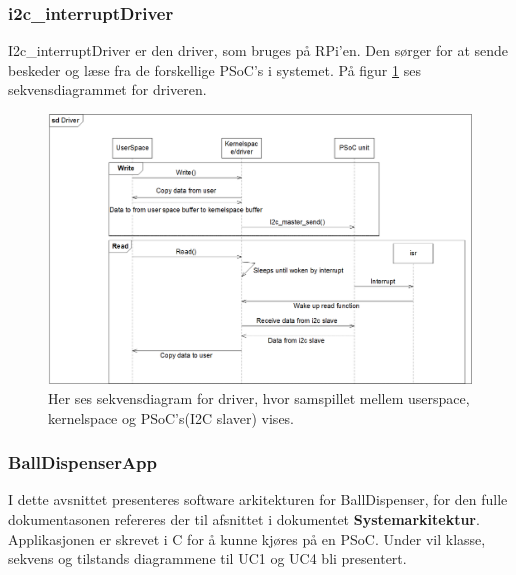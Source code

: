 \documentclass[Rapport/Rapport_main.tex]{subfiles}
\begin{document}
\subsubsection{i2c\_interruptDriver}\label{sec:rap_i2c_intdriver}
I2c\_interruptDriver er den driver, som bruges på RPi'en. Den sørger for at sende beskeder og læse fra de forskellige PSoC's i systemet. På figur \ref{fig:driver_sekvensdiagram} ses sekvensdiagrammet for driveren. 
\begin{figure}[H]
    \centering
    \includegraphics[width=\textwidth]{Rapport/Arkitektur/graphics/driver_sekvensdiagram.png}
    \caption{Her ses sekvensdiagram for driver, hvor samspillet mellem userspace, kernelspace og PSoC's(I2C slaver) vises.}
    \label{fig:driver_sekvensdiagram}
\end{figure}

\subsubsection{BallDispenserApp}
I dette avsnittet presenteres software arkitekturen for BallDispenser, for den fulle dokumentasonen refereres der til afsnittet  i dokumentet \textbf{Systemarkitektur}. Applikasjonen er skrevet i C for å kunne kjøres på en PSoC. Under vil klasse, sekvens og tilstands diagrammene til UC1 og UC4 bli presentert.\\\\
\end{document}
